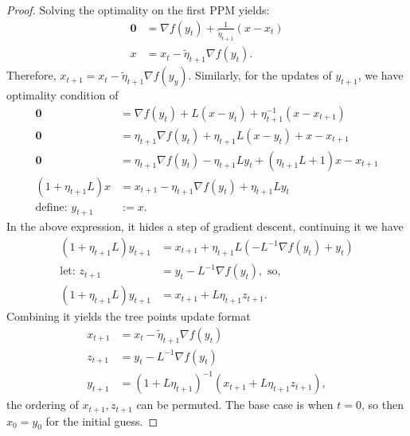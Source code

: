 \documentclass[12pt]{article}
\begin{document}
            \begin{proof}
                Solving the optimality on the first PPM yields: 
                \begin{align*}
                    \mathbf 0 &= \nabla f(y_t) + 
                    \frac{1}{\tilde \eta_{t + 1}} (x - x_t)
                    \\
                    x &= x_t - \tilde \eta_{t + 1} \nabla f(y_t).
                \end{align*}
                Therefore, $x_{t + 1} = x_t - \tilde \eta_{t + 1}\nabla f(y_y)$. 
                Similarly, for the updates of $y_{t + 1}$, we have optimality condition of 
                \begin{align*}
                    \mathbf 0 &= \nabla f (y_t) + L (x - y_t) + \eta_{t + 1}^{-1} (x - x_{t + 1})
                    \\
                    \mathbf 0 &= \eta_{t + 1}\nabla f (y_t) + \eta_{t + 1}L (x - y_t) + x - x_{t + 1}
                    \\
                    \mathbf 0 &= 
                    \eta_{t + 1}\nabla f(y_t) -\eta_{t + 1} Ly_t + (\eta_{t + 1}L + 1)x - x_{t + 1}
                    \\
                    (1 + \eta_{t + 1}L)x
                    &= 
                    x_{t + 1} - \eta_{t + 1}\nabla f(y_t) + \eta_{t + 1}L y_t
                    \\
                    \text{define: } y_{t + 1} &:= x. 
                \end{align*}
                In the above expression, it hides a step of gradient descent, continuing it we have 
                \begin{align*}
                    (1 + \eta_{t + 1}L)y_{t + 1} &= 
                    x_{t + 1}  + \eta_{t + 1}L (-L^{-1}\nabla f(y_t) + y_t)
                    \\
                    \text{let: } z_{t + 1} &= y_t - L^{-1}\nabla f(y_t), \text{ so, }
                    \\
                    (1 + \eta_{t + 1}L)y_{t + 1} &= 
                    x_{t + 1} + L\eta_{t + 1}z_{t + 1}. 
                \end{align*}
                Combining it yields the tree points update format 
                \begin{align*}
                    x_{t + 1} &= x_t - \tilde \eta_{t + 1} \nabla f(y_t) 
                    \\
                    z_{t + 1} &= y_t - L^{-1} \nabla f(y_t) 
                    \\
                    y_{t + 1} &= 
                    (1 + L\eta_{t + 1})^{-1}
                    (
                    x_{t + 1} + L\eta_{t + 1}z_{t + 1}
                    ), 
                \end{align*}
                the ordering of $x_{t +1}, z_{t + 1}$ can be permuted. 
                The base case is when $t = 0$, so then $x_0 = y_0$ for the initial guess.
            \end{proof}
\end{document}
